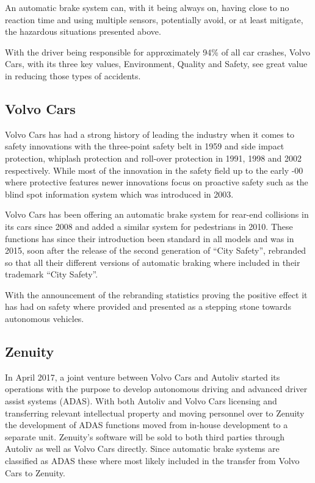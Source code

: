 \documentclass[conference]{IEEEtran}
\begin{document}
An automatic brake system can, with it being always on, having close to no reaction time and using multiple sensors, potentially avoid, or at least mitigate, the hazardous situations presented above.

With the driver being responsible for approximately 94\% of all car crashes, Volvo Cars, with its three key values, Environment, Quality and Safety, see great value in reducing those types of accidents.\cite{CrashStats,VolvoValues}

\subsection{Volvo Cars}
Volvo Cars has had a strong history of leading the industry when it comes to safety innovations with the three-point safety belt in 1959 and side impact protection, whiplash protection and roll-over protection in 1991, 1998 and 2002 respectively. 
While most of the innovation in the safety field up to the early -00 where protective features newer innovations focus on proactive safety such as the blind spot information system which was introduced in 2003.\cite{VolvoInnovation}

Volvo Cars has been offering an automatic brake system for rear-end collisions in its cars since 2008 and added a similar system for pedestrians in 2010. \cite{VolvoInnovation}
These functions has since their introduction been standard in all models and was in 2015, soon after the release of the second generation of ``City Safety'', rebranded so that all their different versions of automatic braking where included in their trademark ``City Safety''.\cite{CitySafety}

With the announcement of the rebranding statistics proving the positive effect it has had on safety where provided and presented as a stepping stone towards autonomous vehicles.\cite{CitySafety}

\subsection{Zenuity}
In April 2017, a joint venture between Volvo Cars and Autoliv started its operations with the purpose to develop autonomous driving and advanced driver assist systems (ADAS). With both Autoliv and Volvo Cars licensing and transferring relevant intellectual property and moving personnel over to Zenuity the development of ADAS functions moved from in-house development to a separate unit. Zenuity's software will be sold to both third parties through Autoliv as well as Volvo Cars directly. \cite{ZenuityLaunch} Since automatic brake systems are classified as ADAS these where most likely included in the transfer from Volvo Cars to Zenuity.
\end{document}
